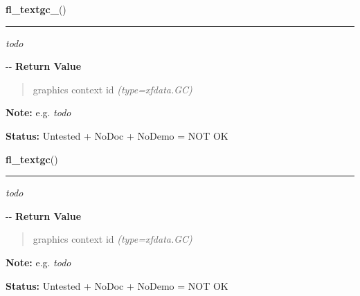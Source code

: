     \label{xformslib:flmisc:fl_textgc_}

    \vspace{0.5ex}

\hspace{.8\funcindent}\begin{boxedminipage}{\funcwidth}

    \raggedright \textbf{fl\_textgc\_}()

    \vspace{-1.5ex}

    \rule{\textwidth}{0.5\fboxrule}
\setlength{\parskip}{2ex}

\emph{todo}

-{}-
\setlength{\parskip}{1ex}
      \textbf{Return Value}
    \vspace{-1ex}

      \begin{quote}

graphics context id
      {\it (type=xfdata.GC)}

      \end{quote}

\textbf{Note:} 
e.g. \emph{todo}


\textbf{Status:} 
Untested + NoDoc + NoDemo = NOT OK


    \end{boxedminipage}

    \label{xformslib:flmisc:fl_textgc_}

    \vspace{0.5ex}

\hspace{.8\funcindent}\begin{boxedminipage}{\funcwidth}

    \raggedright \textbf{fl\_textgc}()

    \vspace{-1.5ex}

    \rule{\textwidth}{0.5\fboxrule}
\setlength{\parskip}{2ex}

\emph{todo}

-{}-
\setlength{\parskip}{1ex}
      \textbf{Return Value}
    \vspace{-1ex}

      \begin{quote}

graphics context id
      {\it (type=xfdata.GC)}

      \end{quote}

\textbf{Note:} 
e.g. \emph{todo}


\textbf{Status:} 
Untested + NoDoc + NoDemo = NOT OK


    \end{boxedminipage}

